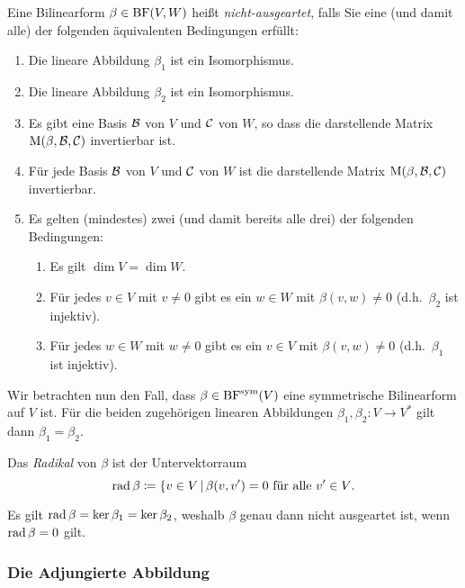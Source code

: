 \begin{definition}
  Eine Bilinearform $\beta \in \operatorname{BF}(V,W)$ heißt \emph{nicht-ausgeartet}, falls Sie eine (und damit alle) der folgenden äquivalenten Bedingungen erfüllt:
  \begin{enumerate}
    \item
      Die lineare Abbildung $\beta_1$ ist ein Isomorphismus.
    \item
      Die lineare Abbildung $\beta_2$ ist ein Isomorphismus.
    \item
      Es gibt eine Basis $\mathcal{B}$ von $V$ und $\mathcal{C}$ von $W$, so dass die darstellende Matrix $\operatorname{M}(\beta, \mathcal{B}, \mathcal{C})$ invertierbar ist.
    \item
      Für jede Basis $\mathcal{B}$ von $V$ und $\mathcal{C}$ von $W$ ist die darstellende Matrix $\operatorname{M}(\beta, \mathcal{B}, \mathcal{C})$ invertierbar.
    \item
      Es gelten (mindestes) zwei (und damit bereits alle drei) der folgenden Bedingungen:
      \begin{enumerate}
        \item
          Es gilt $\dim V = \dim W$.
        \item
          Für jedes $v \in V$ mit $v \neq 0$ gibt es ein $w \in W$ mit $\beta(v,w) \neq 0$ (d.h.\ $\beta_2$ ist injektiv).
        \item
          Für jedes $w \in W$ mit $w \neq 0$ gibt es ein $v \in V$ mit $\beta(v,w) \neq 0$ (d.h.\ $\beta_1$ ist injektiv).
      \end{enumerate}
  \end{enumerate}
\end{definition}

Wir betrachten nun den Fall, dass $\beta \in \operatorname{BF}^{\operatorname{sym}}(V)$ eine symmetrische Bilinearform auf $V$ ist.
Für die beiden zugehörigen linearen Abbildungen $\beta_1, \beta_2 \colon V \to V^*$ gilt dann $\beta_1 = \beta_2$.

\begin{definition}
  Das \emph{Radikal} von $\beta$ ist der Untervektorraum
  \[
              \operatorname{rad} \beta
    \coloneqq \{v \in V \,|\, \text{$\beta(v,v') = 0$ für alle $v' \in V$}.
  \]
\end{definition}

Es gilt $\operatorname{rad} \beta = \ker \beta_1 = \ker \beta_2$, weshalb $\beta$ genau dann nicht ausgeartet ist, wenn $\operatorname{rad} \beta = 0$ gilt.



\subsubsection{Die Adjungierte Abbildung}


